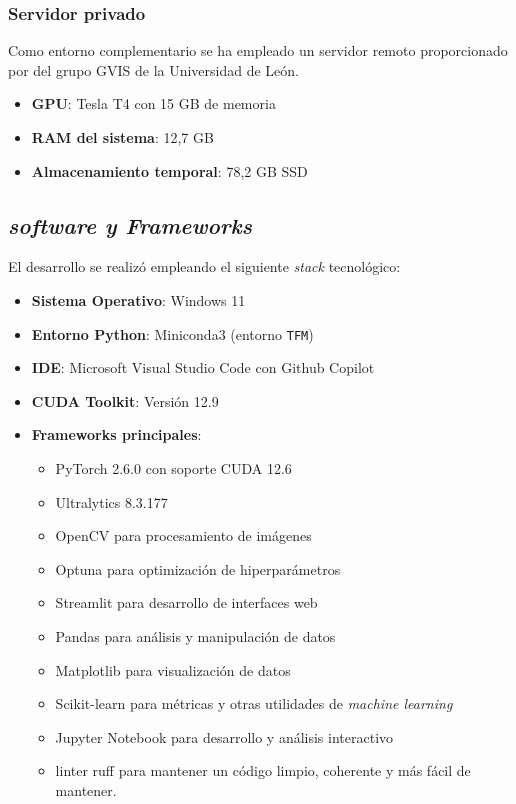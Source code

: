 \documentclass[12pt,a4paper,onecolumn,oneside]{report}
\begin{document}
\subsubsection{Servidor privado}
\label{sec:servidor_privado}
Como entorno complementario se ha empleado un servidor remoto proporcionado por del grupo GVIS de la Universidad de León.

\begin{itemize}
    \item \textbf{GPU}: Tesla T4 con 15 GB de memoria
    \item \textbf{RAM del sistema}: 12,7 GB
    \item \textbf{Almacenamiento temporal}: 78,2 GB SSD
\end{itemize}

\subsection{\textit{software y Frameworks}}

El desarrollo se realizó empleando el siguiente \textit{stack} tecnológico:

\begin{itemize}
    \item \textbf{Sistema Operativo}: Windows 11
    \item \textbf{Entorno Python}: Miniconda3 (entorno \texttt{TFM})
    \item \textbf{IDE}: Microsoft Visual Studio Code con Github Copilot
    \item \textbf{CUDA Toolkit}: Versión 12.9
    \item \textbf{Frameworks principales}:
    \begin{itemize}
        \item PyTorch 2.6.0 con soporte CUDA 12.6
        \item Ultralytics 8.3.177
        \item OpenCV para procesamiento de imágenes
        \item Optuna para optimización de hiperparámetros 
        \item Streamlit para desarrollo de interfaces web
        \item Pandas para análisis y manipulación de datos
        \item Matplotlib para visualización de datos 
        \item Scikit-learn para métricas y otras utilidades de \textit{machine learning}
        \item Jupyter Notebook para desarrollo y análisis interactivo
        \item linter ruff para mantener un código limpio, coherente y más fácil de mantener.
    \end{itemize}
\end{itemize}
\end{document}
